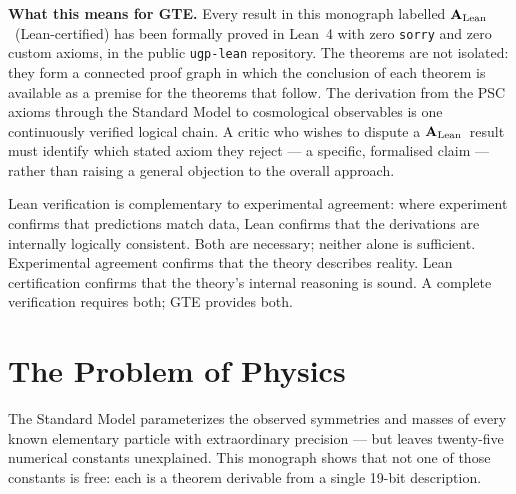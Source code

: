 \documentclass[11pt,openany]{book}
\theoremstyle{remark}
\newcommand{\CatAL}{\ensuremath{\textbf{A}_{\rm Lean}}}
\begin{document}
\begin{tcolorbox}[colback=gray!5,colframe=gray!60!black,
  title={What Is Lean Formalization?},breakable]
\medskip

\textbf{What this means for GTE.}\quad
Every result in this monograph labelled \CatAL\ (Lean-certified) has been
formally proved in Lean~4 with zero \texttt{sorry} and zero custom axioms,
in the public \texttt{ugp-lean} repository.
The theorems are not isolated: they form a connected proof graph in which the
conclusion of each theorem is available as a premise for the theorems that
follow.
The derivation from the PSC axioms through the Standard Model to cosmological
observables is one continuously verified logical chain.
A critic who wishes to dispute a \CatAL\ result must identify which stated
axiom they reject --- a specific, formalised claim --- rather than raising a
general objection to the overall approach.

\medskip\noindent
Lean verification is complementary to experimental agreement: where experiment confirms that
predictions match data, Lean confirms that the derivations are internally logically consistent.
Both are necessary; neither alone is sufficient.
Experimental agreement confirms that the theory describes reality.
Lean certification confirms that the theory's internal reasoning is sound.
A complete verification requires both; GTE provides both.

\end{tcolorbox}

\clearpage

\chapter{The Problem of Physics}
\label{chap:problem}

\begin{tcolorbox}[colback=blue!5,colframe=blue!50!black,title={Chapter~1 Claim}]
The Standard Model parameterizes the observed symmetries and masses of every known
elementary particle with extraordinary precision --- but leaves twenty-five numerical
constants unexplained. This monograph shows that not one of those constants is free:
each is a theorem derivable from a single 19-bit description.
\end{tcolorbox}
\end{document}
